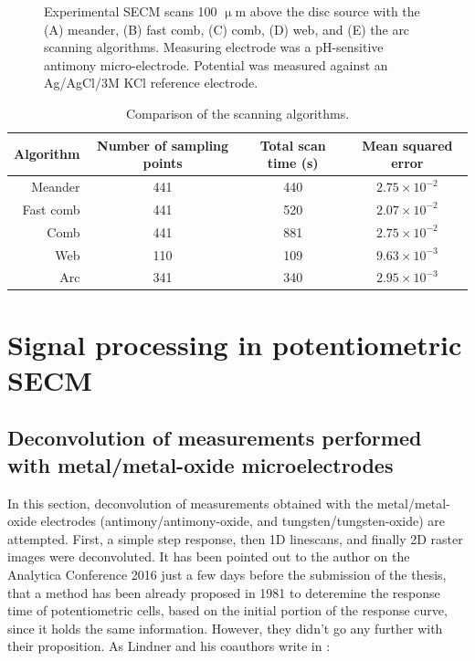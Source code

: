 \begin{figure}[H]
\caption[Experimental SECM scans 100 $\upmu$m above the disc source.]{Experimental SECM scans 100 $\upmu$m above the disc source with the (A) meander, (B) fast comb, (C) comb, (D) web, and (E) the arc scanning algorithms.
Measuring electrode was a pH-sensitive antimony micro-electrode.
Potential was measured against an Ag/AgCl/3M KCl reference electrode.}
\label{fig:measurements}
\end{figure}

\begin{table}
                \caption{Comparison of the scanning algorithms.}
                \label{table:comp}
                \centering
                \begin{tabular}{r c c c}
                        Algorithm & Number of sampling points & Total scan time (s) & Mean squared error \\
                        \hline
                        Meander & 441 & 440 & $2.75\times 10^{-2}$ \\
                        Fast comb & 441 & 520  & $2.07\times 10^{-2}$ \\
                        Comb & 441 & 881 & $2.75\times 10^{-2}$ \\
                        Web & 110 & 109 & $9.63\times 10^{-3}$ \\
			Arc & 341 & 340 & $2.95\times 10^{-3}$ \\
                \end{tabular}
\end{table}

	\newpage
	\section{Signal processing in potentiometric SECM}
	\label{dec_result}

		\subsection{Deconvolution of measurements performed with metal/metal-oxide microelectrodes}
In this section, deconvolution of measurements obtained with the metal/metal-oxide electrodes (antimony/antimony-oxide, and tungsten/tungsten-oxide) are attempted.
First, a simple step response, then 1D linescans, and finally 2D raster images were deconvoluted.
It has been pointed out to the author on the Analytica Conference 2016 just a few days before the submission of the thesis, that a method has been already proposed in 1981 to deteremine the response time of potentiometric cells, based on the initial portion of the response curve, since it holds the same information.
However, they didn't go any further with their proposition.
As Lindner and his coauthors write in \cite{lindner1984definition}:

